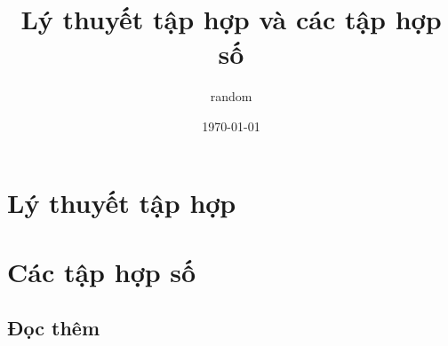 \documentclass[oneside]{book}
\title{Lý thuyết tập hợp và các tập hợp số}
\author{random}
\date{\today}
\theoremstyle{definition}
\begin{document}
\maketitle




\tableofcontents

\part{Lý thuyết tập hợp}\label{part1}





\part{Các tập hợp số}\label{part2}






\appendix

\chapter{Đọc thêm}

\printindex
\end{document}
